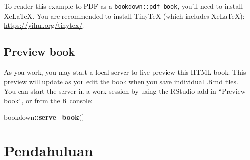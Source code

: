 \documentclass[
]{book}
\newenvironment{Shaded}{\begin{snugshade}}{\end{snugshade}}
\newcommand{\FunctionTok}[1]{\textcolor[rgb]{0.13,0.29,0.53}{\textbf{#1}}}
\newcommand{\NormalTok}[1]{#1}
\newcommand{\SpecialCharTok}[1]{\textcolor[rgb]{0.81,0.36,0.00}{\textbf{#1}}}
\theoremstyle{definition}
\theoremstyle{definition}
\theoremstyle{definition}
\theoremstyle{definition}
\theoremstyle{remark}
\begin{document}
To render this example to PDF as a \texttt{bookdown::pdf\_book}, you'll need to install XeLaTeX. You are recommended to install TinyTeX (which includes XeLaTeX): \url{https://yihui.org/tinytex/}.

\hypertarget{preview-book}{%
\section{Preview book}\label{preview-book}}

As you work, you may start a local server to live preview this HTML book. This preview will update as you edit the book when you save individual .Rmd files. You can start the server in a work session by using the RStudio add-in ``Preview book'', or from the R console:

\begin{Shaded}
\begin{Highlighting}[]
\NormalTok{bookdown}\SpecialCharTok{::}\FunctionTok{serve\_book}\NormalTok{()}
\end{Highlighting}
\end{Shaded}

\hypertarget{pendahuluan}{%
\chapter{Pendahuluan}\label{pendahuluan}}
\end{document}
